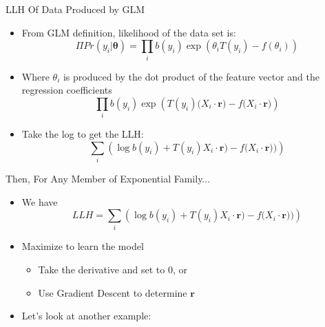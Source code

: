 \documentclass[aspectratio=169]{beamer}
\begin{document}
%
\begin{frame}{LLH Of Data Produced by GLM}

\begin{itemize}
\item From GLM definition, likelihood of the data set is: %
$$\Pi Pr(y_i|\boldsymbol{\theta}) = \prod_i b(y_i) \exp (\theta_i T(y_i) - f(\theta_i))$$
\item Where $\theta_i$ is produced by the dot product of the feature vector and the regression coefficients
$$\prod_i b(y_i) \exp \left(T(y_i) \Big(X_i \cdot \boldsymbol{r}\Big) - f\Big(X_i \cdot \boldsymbol{r}\Big) \right)$$
\item Take the log to get the LLH: %
$$\sum_i \left( \log b(y_i) + T(y_i) X_i \cdot \boldsymbol{r} \Big) - f\Big(X_i \cdot \boldsymbol{r}  \Big)\Big) \right)$$
\end{itemize}
\end{frame}
\begin{frame}{Then, For Any Member of Exponential Family...}

\begin{itemize}
\item We have
$$LLH = \sum_i \left( \log b(y_i) + T(y_i) X_i \cdot \boldsymbol{r} \Big) - f\Big(X_i \cdot \boldsymbol{r}  \Big)\Big) \right)$$

\item Maximize to learn the model
\begin{itemize}
\item Take the derivative and set to 0, or
\item Use Gradient Descent to determine $\boldsymbol{r}$
\end{itemize}
\item Let's look at another example:
\end{itemize}
\end{frame}
\end{document}
